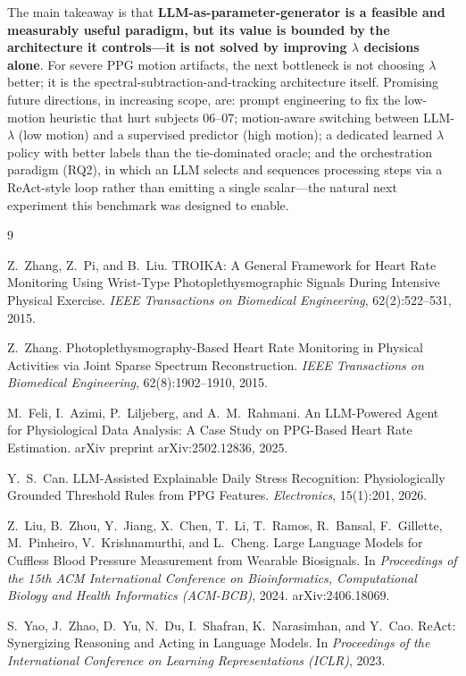 \documentclass[sigconf,nonacm,11pt]{acmart}
\begin{document}
The main takeaway is that \textbf{LLM-as-parameter-generator is a feasible and measurably useful paradigm, but its value is bounded by the architecture it controls---it is not solved by improving $\lambda$ decisions alone}. For severe PPG motion artifacts, the next bottleneck is not choosing $\lambda$ better; it is the spectral-subtraction-and-tracking architecture itself. Promising future directions, in increasing scope, are: prompt engineering to fix the low-motion heuristic that hurt subjects 06--07; motion-aware switching between LLM-$\lambda$ (low motion) and a supervised predictor (high motion); a dedicated learned $\lambda$ policy with better labels than the tie-dominated oracle; and the orchestration paradigm (RQ2), in which an LLM selects and sequences processing steps via a ReAct-style loop rather than emitting a single scalar---the natural next experiment this benchmark was designed to enable.

\begin{thebibliography}{9}

Z.~Zhang, Z.~Pi, and B.~Liu.
\newblock TROIKA: A General Framework for Heart Rate Monitoring Using Wrist-Type Photoplethysmographic Signals During Intensive Physical Exercise.
\newblock \emph{IEEE Transactions on Biomedical Engineering}, 62(2):522--531, 2015.

Z.~Zhang.
\newblock Photoplethysmography-Based Heart Rate Monitoring in Physical Activities via Joint Sparse Spectrum Reconstruction.
\newblock \emph{IEEE Transactions on Biomedical Engineering}, 62(8):1902--1910, 2015.

M.~Feli, I.~Azimi, P.~Liljeberg, and A.~M.~Rahmani.
\newblock An LLM-Powered Agent for Physiological Data Analysis: A Case Study on PPG-Based Heart Rate Estimation.
\newblock arXiv preprint arXiv:2502.12836, 2025.

Y.~S.~Can.
\newblock LLM-Assisted Explainable Daily Stress Recognition: Physiologically Grounded Threshold Rules from PPG Features.
\newblock \emph{Electronics}, 15(1):201, 2026.

Z.~Liu, B.~Zhou, Y.~Jiang, X.~Chen, T.~Li, T.~Ramos, R.~Bansal, F.~Gillette, M.~Pinheiro, V.~Krishnamurthi, and L.~Cheng.
\newblock Large Language Models for Cuffless Blood Pressure Measurement from Wearable Biosignals.
\newblock In \emph{Proceedings of the 15th ACM International Conference on Bioinformatics, Computational Biology and Health Informatics (ACM-BCB)}, 2024. arXiv:2406.18069.

S.~Yao, J.~Zhao, D.~Yu, N.~Du, I.~Shafran, K.~Narasimhan, and Y.~Cao.
\newblock ReAct: Synergizing Reasoning and Acting in Language Models.
\newblock In \emph{Proceedings of the International Conference on Learning Representations (ICLR)}, 2023.

\end{thebibliography}
\end{document}
